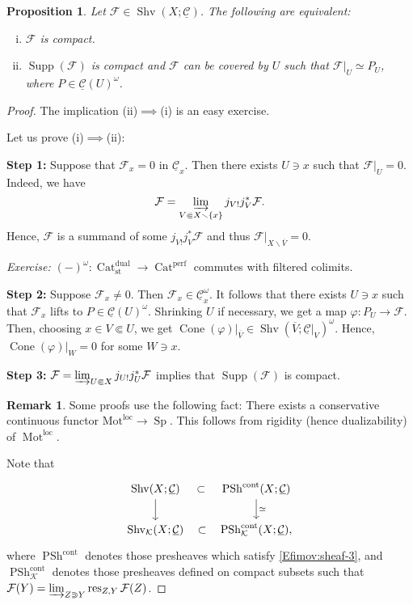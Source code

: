 \documentclass[draft]{amsart}
\newcommand{\ol}[1]{\overline{#1}}
\newcommand{\ul}[1]{\underline{#1}}
\newcommand{\cat}[1]{\mathcal{#1}}
\newcommand{\sheaf}[1]{\mathcal{#1}}
\renewcommand{\setminus}{\smallsetminus}
\newcommand{\blank}{-} %
\DeclareMathOperator{\Shv}{Shv}
\DeclareMathOperator{\Cat}{Cat}
\DeclareMathOperator{\Sp}{Sp}
\DeclareMathOperator{\PSh}{PSh}
\DeclareMathOperator{\Supp}{Supp}
\DeclareMathOperator{\res}{res}
\DeclareMathOperator{\Cone}{Cone}
\DeclareMathOperator{\Mot}{Mot}
\newtheorem{prop}[thm]{Proposition}
\theoremstyle{definition}
\newtheorem{rem}[thm]{Remark}
\begin{document}
\begin{prop}
Let $\sheaf F\in \Shv(X;\ul{\cat C})$. The following are equivalent:
\begin{enumerate}[(i)]
\item $\sheaf F$ is compact.
\item $\Supp(\sheaf F)$ is compact and $\sheaf F$ can be covered by $U$ such that $\sheaf F\big|_{U} \simeq P_U$, where $P\in \ul{\cat C}(U)^{\omega}$.
\end{enumerate}
\end{prop}
\begin{proof}
The implication (ii)$\implies$(i) is an easy exercise.\medskip

Let us prove (i)$\implies$(ii):

\textbf{Step 1:} Suppose that $\sheaf F_x = 0$ in $\ul{\cat C}_x$. Then there exists $U\ni x$ such that $\sheaf F\big|_U = 0$. Indeed, we have 
\[
\sheaf F = \varinjlim_{V\Subset X\setminus\{x\}} j_{V!}j_V^* \sheaf F.
\]
Hence, $\sheaf F$ is a summand of some $j_{V!} j_V^*\sheaf F$ and thus $\sheaf F\big|_{X\setminus \ol V} = 0$.

\textit{Exercise:} $(\blank)^\omega\colon \Cat^{\mathrm{dual}}_{\mathrm{st}} \to \Cat^{\mathrm{perf}}$ commutes with filtered colimits.

\textbf{Step 2:} Suppose $\sheaf F_x \neq 0$. Then $\sheaf F_x \in \ul{\cat C}_x^{\omega}$. It follows that there exists $U\ni x$ such that $\sheaf F_x$ lifts to $P\in \ul{\cat C}(U)^\omega$. Shrinking $U$ if necessary, we get a map $\varphi \colon P_U \to \sheaf F$. Then, choosing $x\in V\Subset U$, we get $\Cone(\varphi)\big|_{\ol V} \in \Shv(\ol V; \ul{\cat C}\big|_V)^\omega$. Hence, $\Cone(\varphi)\big|_W = 0$ for some $W\ni x$.

\textbf{Step 3:} $\sheaf F = \varinjlim_{U\Subset X} j_{U!} j_U^*\sheaf F$ implies that $\Supp(\sheaf F)$ is compact.

\begin{rem}
Some proofs use the following fact: There exists a conservative continuous functor $\mathrm{Mot}^{\mathrm{loc}} \to \Sp$. This follows from rigidity (hence dualizability) of $\Mot^{\mathrm{loc}}$.
\end{rem}

Note that
\[
\begin{tikzcd}
\Shv(X; \ul{\cat C}) \ar[r,phantom,"\subset"] \ar[d] & \PSh^{\mathrm{cont}}(X; \ul{\cat C}) \ar[d,"\simeq"] \\
\Shv_{\sheaf K}(X; \ul{\cat C}) \ar[r,phantom, "\subset"] & \PSh^{\mathrm{cont}}_{\sheaf K}(X; \ul{\cat C}),
\end{tikzcd}
\]
where $\PSh^{\mathrm{cont}}$ denotes those presheaves which satisfy \ref{Efimov:sheaf-3}, and $\PSh^{\mathrm{cont}}_{\sheaf K}$ denotes those presheaves defined on compact subsets such that $\sheaf F(Y) = \varinjlim_{Z\Supset Y} \res_{Z,Y}\sheaf F(Z)$. 


\end{proof}
\end{document}
